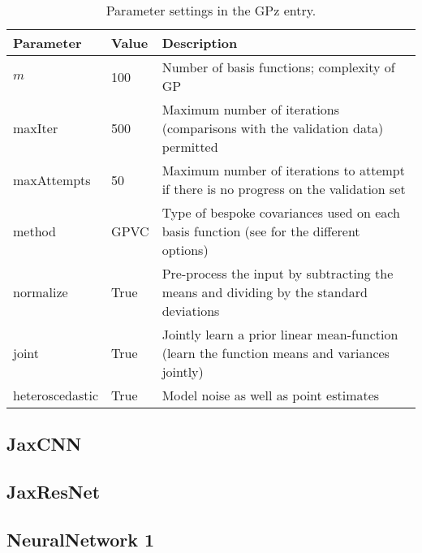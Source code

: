 \documentclass[twocolumn,twocolappendix]{aastex63}
\begin{document}
\begin{table*}[]
\begin{center}
    \begin{tabular}{| l | l | l |}
    \hline
    Parameter   &   Value   &   Description\\  
    \hline 
    $m$         &   100     &   Number of basis functions; complexity of GP\\

    maxIter     &   500     &   Maximum number of iterations (comparisons with 
                                the validation data) permitted\\

    maxAttempts &   50      &   Maximum number of iterations to attempt if there 
                                is no progress on the validation set\\

    method      &   GPVC    &   Type of bespoke covariances used on each basis 
                                function (see \cite{Almosallam2016b} for 
                                the different options)\\

    normalize   &   True    &   Pre-process the input by subtracting the means
                                and dividing by the standard deviations\\

    joint       &   True    &   Jointly learn a prior linear mean-function 
                                (learn the function means and variances 
                                jointly)\\

    heteroscedastic  & True & Model noise as well as point estimates \\
    \hline
    \end{tabular}
\caption{Parameter settings in the GPz entry.}
\end{center}
\label{table-settings}
\end{table*}

\subsection{ {\sc JaxCNN} }


\subsection{ {\sc JaxResNet} }


\subsection{ {\sc NeuralNetwork 1} }
\end{document}
